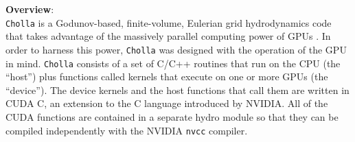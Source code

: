 \documentclass[11pt,letterpaper,english]{article}
\begin{document}

{\bf Overview}:\\
{\tt Cholla} is a Godunov\cite{Godunov59}-based, finite-volume, Eulerian grid hydrodynamics code that takes advantage of the massively parallel computing power of GPUs \cite{Schneider15}. In order to harness this power, {\tt Cholla} was designed with the operation of the GPU in mind. {\tt Cholla} consists of a set of C/C++ routines that run on the CPU 
(the ``host'') plus functions called kernels that execute on one or more GPUs (the ``device''). The device kernels and the host functions that call them are written in CUDA C, an extension to the C language introduced by NVIDIA. All of the CUDA functions are contained in a separate hydro module so that they can be compiled independently with the NVIDIA {\tt nvcc} compiler. %
\end{document}
